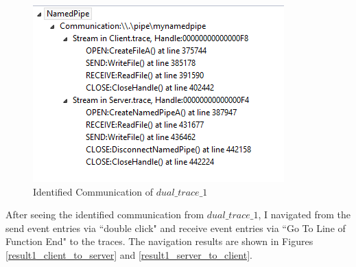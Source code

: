 \begin{figure}[H]
\centerline{\includegraphics{Figures/result1_communications}}
 \caption{Identified Communication of $dual\_trace\_1$}
\label{result1_communications}
\end{figure}


After seeing the identified communication from $dual\_trace\_1$, I navigated from the send event entries via ``double click" and receive event entries via ``Go To Line of Function End" to the traces. The navigation results are shown in Figures \ref{result1_client_to_server} and \ref{result1_server_to_client}.

